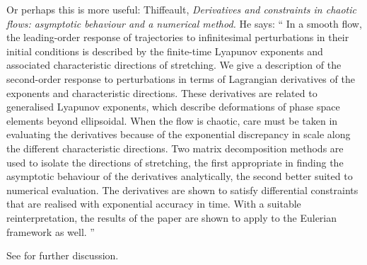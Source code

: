 \begin{description}
Or perhaps this is more useful:
Thiffeault,
\emph{Derivatives and constraints in chaotic flows:
asymptotic behaviour and a numerical method.}
He says: ``
In a smooth flow, the leading-order response of trajectories to
infinitesimal perturbations in their initial conditions is described by
the finite-time Lyapunov exponents and associated characteristic
directions of stretching. We give a description of the second-order
response to perturbations in terms of Lagrangian derivatives of the
exponents and characteristic directions. These derivatives are related to
generalised Lyapunov exponents, which describe deformations of phase
space elements beyond ellipsoidal. When the flow is chaotic, care must be
taken in evaluating the derivatives because of the exponential
discrepancy in scale along the different characteristic directions. Two
matrix decomposition methods are used to isolate the directions of
stretching, the first appropriate in finding the asymptotic behaviour of
the derivatives analytically, the second better suited to numerical
evaluation. The derivatives are shown to satisfy differential constraints
that are realised with exponential accuracy in time. With a suitable
reinterpretation, the results of the paper are shown to apply to the
Eulerian framework as well.
''

See  for further discussion.


\end{description}
